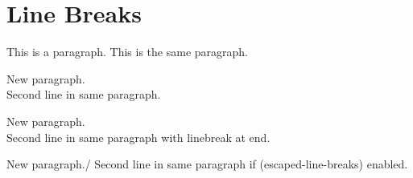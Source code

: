 
\def\mytitle{Line Break Test}


\part{Line Breaks}
\label{linebreaks}

This is a paragraph.
This is the same paragraph.

New paragraph.\\
Second line in same paragraph.

New paragraph.\\
Second line in same paragraph with linebreak at end. 

New paragraph.\slash 
Second line in same paragraph if (escaped-line-breaks) enabled.




